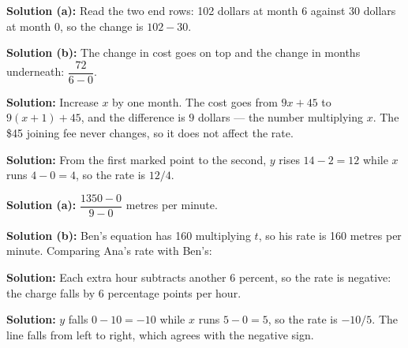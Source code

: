 \documentclass[12pt]{article}
\begin{document}




\textbf{Solution (a):} Read the two end rows: 102 dollars at month 6 against
30 dollars at month 0, so the change is $102 - 30$. 

\textbf{Solution (b):} The change in cost goes on top and the change in months
underneath: $\dfrac{72}{6 - 0}$. 


\textbf{Solution:} Increase $x$ by one month. The cost goes from $9x + 45$ to
$9(x + 1) + 45$, and the difference is $9$ dollars --- the number multiplying
$x$. The \$45 joining fee never changes, so it does not affect the rate.


\textbf{Solution:} From the first marked point to the second, $y$ rises
$14 - 2 = 12$ while $x$ runs $4 - 0 = 4$, so the rate is $12/4$.


\textbf{Solution (a):} $\dfrac{1350 - 0}{9 - 0}$ metres per minute.

\textbf{Solution (b):} Ben's equation has 160 multiplying $t$, so his rate is
160 metres per minute. Comparing Ana's rate with Ben's: 


\textbf{Solution:} Each extra hour subtracts another 6 percent, so the rate is
negative: the charge falls by 6 percentage points per hour. 


\textbf{Solution:} $y$ falls $0 - 10 = -10$ while $x$ runs $5 - 0 = 5$, so the
rate is $-10/5$. The line falls from left to right, which agrees with the
negative sign. 

\end{document}
